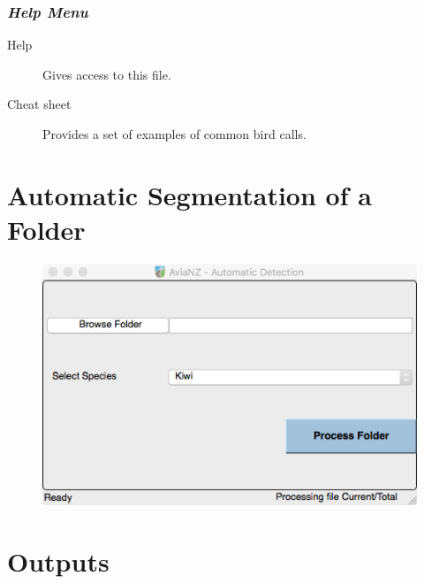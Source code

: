 \documentclass{article}
\begin{document}
\subsubsection{{\em Help Menu}}

\begin{description}
\item [Help] Gives access to this file.
\item [Cheat sheet] Provides a set of examples of common bird calls. 
\end{description}


\section{Automatic Segmentation of a Folder}
\label{sec:auto}

\begin{figure}[h!]
\centering
\includegraphics[width=.5\textwidth]{Figs/proc_folder}
\end{figure}

\section{Outputs}
\label{sec:outputs}
\end{document}
